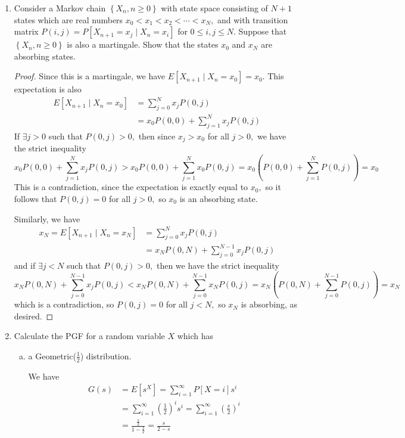 \documentclass{article}
\begin{document}
\begin{enumerate}
	\item Consider a Markov chain $\left\{ X_n, n\ge 0 \right\}$ with state space consisting of $N+1$ states which are real numbers $x_0<x_1<x_2<\cdots<x_N,$ and with transition matrix $P(i, j)=P[X_{n+1}=x_j\mid X_n=x_i]$ for $0\le i, j\le N.$ Suppose that $\left\{ X_n, n\ge0 \right\}$ is also a martingale. Show that the states $x_0$ and $x_N$ are absorbing states.
		\begin{proof}
			Since this is a martingale, we have $E[X_{n+1}\mid X_n=x_0] = x_0.$ This expectation is also
			\begin{align*}
				E[X_{n+1}\mid X_n=x_0] &= \sum_{j=0}^{N}x_j P(0, j) \\
				&= x_0 P(0, 0) + \sum_{j=1}^{N} x_j P(0, j)
			\end{align*}
			If $\exists j>0$ such that $P(0, j)>0,$ then since $x_j>x_0$ for all $j>0,$ we have the strict inequality
			\[x_0P(0, 0) + \sum_{j=1}^{N} x_j P(0, j)>x_0P(0, 0) + \sum_{j=1}^{N} x_0 P(0, j) = x_0 \left( P(0, 0) + \sum_{j=1}^{N} P(0, j) \right) = x_0\]
			This is a contradiction, since the expectation is exactly equal to $x_0,$ so it follows that $P(0, j)=0$ for all $j>0,$ so $x_0$ is an absorbing state.

			Similarly, we have
			\begin{align*}
				x_N = E[X_{n+1}\mid X_n=x_N] &= \sum_{j=0}^{N} x_j P(0, j) \\
				&= x_N P(0, N) + \sum_{j=0}^{N-1} x_j P(0, j)
			\end{align*}
			and if $\exists j<N$ such that $P(0, j)>0,$ then we have the strict inequality
			\[x_NP(0, N) + \sum_{j=0}^{N-1} x_j P(0, j) < x_N P(0, N) + \sum_{j=0}^{N-1} x_N P(0, j) = x_N\left(P(0, N) + \sum_{j=0}^{N-1} P(0, j)\right) = x_N\]
			which is a contradiction, so $P(0, j)=0$ for all $j<N,$ so $x_N$ is absorbing, as desired.
		\end{proof}

	\item Calculate the PGF for a random variable $X$ which has
		\begin{enumerate}[(a)]
			\item a Geometric($\frac{1}{2}$) distribution.
				\begin{soln}
					We have
					\begin{align*}
						G(s) &= E[s^X] = \sum_{i=1}^{\infty} P[X=i] s^i \\
						&= \sum_{i=1}^{\infty} \left( \frac{1}{2} \right)^i s^i = \sum_{i=1}^{\infty} \left( \frac{s}{2} \right)^i \\
						&= \frac{\frac{s}{2}}{1-\frac{s}{2}} = \frac{s}{2-s}
					\end{align*}
				\end{soln}


\end{enumerate}
\end{enumerate}
\end{document}
